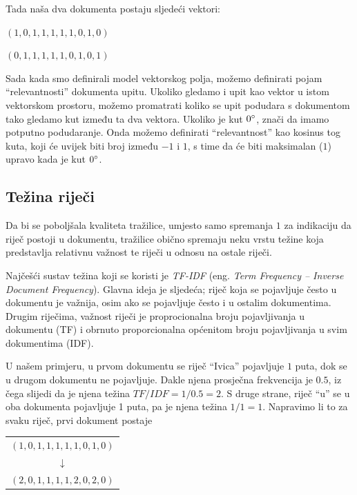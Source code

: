 \documentclass[a4paper,twoside,12pt]{scrreprt}
\newenvironment{nscenter}
 {\par\nopagebreak\centering}
 {\parskip=0pt\par\noindent\ignorespacesafterend}
\begin{document}
Tada naša dva dokumenta postaju sljedeći vektori:

\begin{compactenum}
  \item $(1,0,1,1,1,1,1,0,1,0)$
  \item $(0,1,1,1,1,1,0,1,0,1)$
\end{compactenum}

Sada kada smo definirali model vektorskog polja, možemo definirati pojam ``relevantnosti'' dokumenta upitu. Ukoliko gledamo i upit kao vektor u istom vektorskom prostoru, možemo promatrati koliko se upit podudara s dokumentom tako gledamo kut između ta dva vektora. Ukoliko je kut $0\degree$, znači da imamo potputno podudaranje. Onda možemo definirati ``relevantnost'' kao kosinus tog kuta, koji će uvijek biti broj između $-1$ i $1$, s time da će biti maksimalan ($1$) upravo kada je kut $0\degree$.

\subsection{Težina riječi}
\label{tfidf}

Da bi se poboljšala kvaliteta tražilice, umjesto samo spremanja $1$ za indikaciju da riječ postoji u dokumentu, tražilice obično spremaju neku vrstu težine koja predstavlja relativnu važnost te riječi u odnosu na ostale riječi.

Najčešći sustav težina koji se koristi je \textit{TF-IDF} (eng. \textit{Term Frequency – Inverse Document Frequency}). Glavna ideja je sljedeća; riječ koja se pojavljuje često u dokumentu je važnija, osim ako se pojavljuje često i u ostalim dokumentima. Drugim riječima, važnost riječi je proprocionalna broju pojavljivanja u dokumentu (TF) i obrnuto proporcionalna općenitom broju pojavljivanja u svim dokumentima (IDF).

U našem primjeru, u prvom dokumentu se riječ ``Ivica'' pojavljuje $1$ puta, dok se u drugom dokumentu ne pojavljuje. Dakle njena prosječna frekvencija je $0.5$, iz čega slijedi da je njena težina $TF / IDF = 1 / 0.5 = 2$. S druge strane, riječ ``u'' se u oba dokumenta pojavljuje 1 puta, pa je njena težina $1 / 1 = 1$. Napravimo li to za svaku riječ, prvi dokument postaje

\begin{nscenter}
  \begin{tabular}{c}
    $(1,0,1,1,1,1,1,0,1,0)$ \\
    $\downarrow$            \\
    $(2,0,1,1,1,1,2,0,2,0)$ \\
  \end{tabular}
\end{nscenter}
\end{document}

